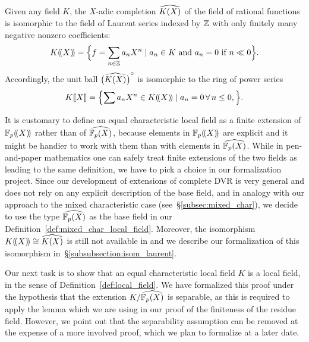 \documentclass[sigplan,10pt, nonacm, review]{acmart}
\begin{document}
\begin{remark}\label{rmk:laurent_vs_adic}
Given any field $K$, the $X$-adic completion $\FpXCompl[K]$ of the field of rational functions is isomorphic to the field of Laurent series indexed by $\ZZ$ with only finitely many negative nonzero coefficients:
\[
\laurentseries[K]=\Bigl\{f=\sum_{n \in\ZZ}a_nX^n \mid a_n \in K\text{ and }a_n = 0 \text{ if }n\ll 0\Bigr\}.
\]
Accordingly, the unit ball $\FpXComplInt[K]$ is isomorphic to the ring of power series
\[
\powerseries[K]=\Bigl\{\sum a_nX^n \in \laurentseries[K]\mid a_n=0 \,\forall\,n\le 0, \Bigr\}.
\]

It is customary to define an equal characteristic local field as a finite extension of $\laurentseries$ rather than of $\FpXCompl$, because elements in $\laurentseries$ are explicit and it might be handier to work with them than with elements in $\FpXCompl$. While in pen-and-paper mathematics one can safely treat finite extensions of the two fields as leading to the same definition, we have to pick a choice in our formalization project. Since our development of extensions of complete DVR is very general and does not rely on any explicit description of the base field, and in analogy with our approach to the mixed characteristic case (see~\S\ref{subsec:mixed_char}), we decide to use the type $\FpXCompl$ as the base field in our Definition~\ref{def:mixed_char_local_field}. Moreover, the isomorphism $\laurentseries[K]\cong \FpXCompl[K]$ is still not available in \mathlib and we describe our formalization of this isomorphism in~\S\ref{subsubsection:isom_laurent}.
\end{remark}

Our next task is to show that an equal characteristic local field $K$ is a local field, in the sense of Definition~\ref{def:local_field}. We have formalized this proof under the hypothesis that the extension $K/\FpXCompl$ is separable, as this is required to apply the \mathlib lemma \href{https://leanprover-community.github.io/mathlib_docs/ring_theory/dedekind_domain/integral_closure.html#is_integral_closure.is_noetherian}{\extlink} which we are using in our proof of the finiteness of the residue field. However, we point out that the separability assumption can be removed at the expense of a more involved proof, which we plan to formalize at a later date.
\end{document}
